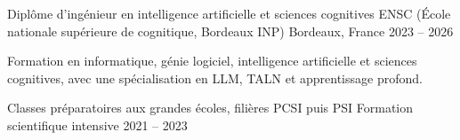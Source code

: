 
\begin{cventries}
  \cventry
    {Diplôme d’ingénieur en intelligence artificielle et sciences cognitives}
    {ENSC (École nationale supérieure de cognitique, Bordeaux INP)}
    {Bordeaux, France}
    {2023 -- 2026}
    {
      \begin{cvitems}
        \item {Formation en informatique, génie logiciel, intelligence artificielle et sciences cognitives, avec une spécialisation en LLM, TALN et apprentissage profond.}
      \end{cvitems}
    }

  \cventry
    {Classes préparatoires aux grandes écoles, filières PCSI puis PSI}
    {Formation scientifique intensive}
    {}
    {2021 -- 2023}
    {}
\end{cventries}
